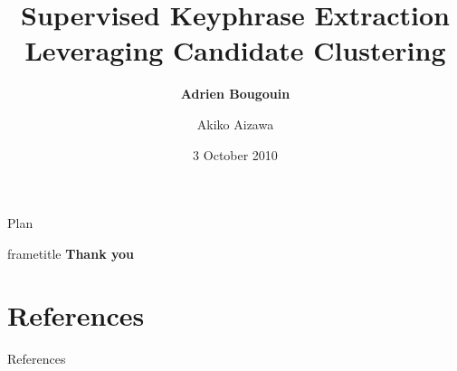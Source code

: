 \documentclass[xcolor={usenames, dvipsnames}]{beamer}
\title{Supervised Keyphrase Extraction Leveraging Candidate Clustering}
\subtitle{}
\author{\textbf{Adrien Bougouin} \and Akiko Aizawa}
\institute{\normalsize{NII, Tokyo (JAPAN)}}
\date{3 October 2010}
\begin{document}
  \renewcommand*{\theenumii}{\alph{enumii}}
  \renewcommand*{\theenumiii}{\roman{enumiii}}

  \begin{frame}
    \titlepage
  \end{frame}
  \setcounter{framenumber}{0}

  
  \begin{frame}{Plan}
    \tableofcontents
  \end{frame}
  
  
  
  
  \begin{frame}
    \vfill
    \begin{beamercolorbox}[center,shadow=true,rounded=true]{frametitle} 
      \Huge{\textbf{Thank you}}
    \end{beamercolorbox} 
    \vfill
  \end{frame}
  
  \section*{References}
    \begin{frame}[allowframebreaks]{References}
      \def\newblock{\hskip .11em plus .33em minus .07em}
      
      
    \end{frame}
\end{document}
